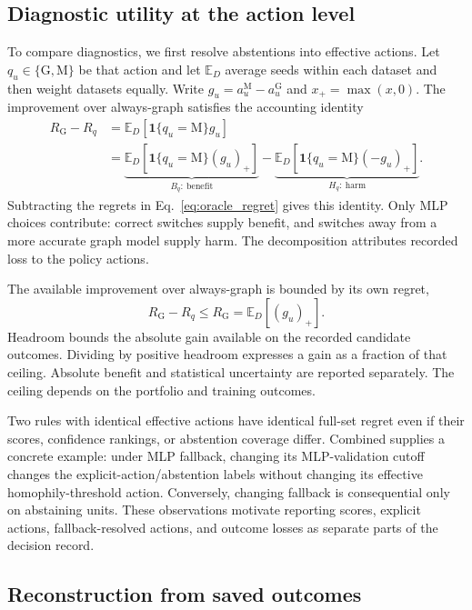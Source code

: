 \subsection{Diagnostic utility at the action level}
\label{sec:action_audit}

To compare diagnostics, we first resolve abstentions into effective actions. Let $q_u\in\{\mathrm{G},\mathrm{M}\}$ be that action and let $\mathbb{E}_D$ average seeds within each dataset and then weight datasets equally. Write $g_u=a_u^{\mathrm{M}}-a_u^{\mathrm{G}}$ and $x_+=\max(x,0)$. The improvement over always-graph satisfies the accounting identity
\begin{align}
R_{\mathrm{G}}-R_q
 &= \mathbb{E}_D[\mathbf{1}\{q_u=\mathrm{M}\}g_u] \\
 &= \underbrace{\mathbb{E}_D[\mathbf{1}\{q_u=\mathrm{M}\}(g_u)_+]}_{B_q:\ \text{benefit}}
 -\underbrace{\mathbb{E}_D[\mathbf{1}\{q_u=\mathrm{M}\}(-g_u)_+]}_{H_q:\ \text{harm}}.
\label{eq:benefit_harm}
\end{align}
Subtracting the regrets in Eq.~\eqref{eq:oracle_regret} gives this identity. Only MLP choices contribute: correct switches supply benefit, and switches away from a more accurate graph model supply harm. The decomposition attributes recorded loss to the policy actions.

The available improvement over always-graph is bounded by its own regret,
\begin{equation}
R_{\mathrm{G}}-R_q\leq R_{\mathrm{G}}=\mathbb{E}_D[(g_u)_+].
\label{eq:headroom_bound}
\end{equation}
Headroom bounds the absolute gain available on the recorded candidate outcomes. Dividing by positive headroom expresses a gain as a fraction of that ceiling. Absolute benefit and statistical uncertainty are reported separately. The ceiling depends on the portfolio and training outcomes.

Two rules with identical effective actions have identical full-set regret even if their scores, confidence rankings, or abstention coverage differ. Combined supplies a concrete example: under MLP fallback, changing its MLP-validation cutoff changes the explicit-action/abstention labels without changing its effective homophily-threshold action. Conversely, changing fallback is consequential only on abstaining units. These observations motivate reporting scores, explicit actions, fallback-resolved actions, and outcome losses as separate parts of the decision record.

\subsection{Reconstruction from saved outcomes}
\label{sec:replay_scope}

